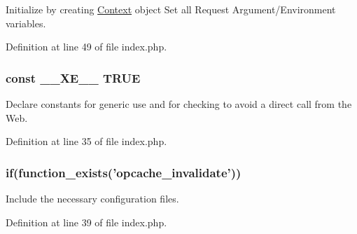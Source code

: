 Initialize by creating \hyperlink{classContext}{Context} object Set all Request Argument/\-Environment variables. 



Definition at line 49 of file index.\-php.

\hypertarget{index_8php_a697de427d83b791899ae45d555377756}{
\subsubsection[{\-\_\-\-\_\-\-X\-E\-\_\-\-\_\-}]{\setlength{\rightskip}{0pt plus 5cm}const \-\_\-\-\_\-\-X\-E\-\_\-\-\_\- T\-R\-U\-E}}\label{index_8php_a697de427d83b791899ae45d555377756}


Declare constants for generic use and for checking to avoid a direct call from the Web. 



Definition at line 35 of file index.\-php.

\hypertarget{index_8php_a89c9c4ffebb12a316e28d000a981cf89}{
\subsubsection[{if}]{\setlength{\rightskip}{0pt plus 5cm}if(function\-\_\-exists('opcache\-\_\-invalidate'))}}\label{index_8php_a89c9c4ffebb12a316e28d000a981cf89}


Include the necessary configuration files. 



Definition at line 39 of file index.\-php.

